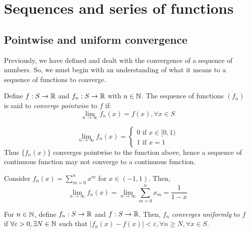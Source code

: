 \chapter{Sequences and series of functions}

\section{Pointwise and uniform convergence}

Previously, we have defined and dealt with the convergence of a sequence of numbers. So, we must begin with an understanding of what it means to a sequence of functions to converge.

\begin{definition}
    Define $f:S \to \mathbb{R}$ and $f_n: S \to \mathbb{R}$ with $n \in \mathbb{N}$. The sequence of functions $(f_n)$ is said to \emph{converge pointwise} to $f$ if:
    \begin{equation*}
        \lim \limits_{n \to \infty} f_n(x) = f(x), \forall x \in S
    \end{equation*}
\end{definition}

\begin{eg}
    \begin{equation*}
        \lim \limits_{n \to \infty} f_n(x) = \begin{cases}
            0 \text{ if } x \in [0,1) \\
            1 \text{ if } x=1
        \end{cases}
    \end{equation*}
    Thus $\{f_n(x)\}$ converges pointwise to the function above, hence a sequence of continuous function may not converge to a continuous function.       
\end{eg}

\begin{eg}
    Consider $f_n(x) = \sum_{m=0}^n x^m$ for $x \in (-1,1)$. Then,
            \begin{equation*}
                \lim \limits_{n \to \infty} f_n(x) = \lim \limits_{n \to \infty} \sum \limits_{m=0}^n x_m = \frac{1}{1-x}
            \end{equation*}
\end{eg}

\begin{definition}
    For $n \in \mathbb{N}$, define $f_n: S \to \mathbb{R}$ and $f: S \to \mathbb{R}$. Then, $f_n$ \emph{converges uniformly} to $f$ if $\forall \varepsilon > 0, \exists N \in \mathbb{N}$ such that $|f_n(x) - f(x)| < \varepsilon, \forall n \geq N, \forall x \in S$.
\end{definition}

